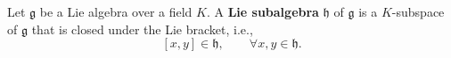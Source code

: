 Let $\mathfrak{g}$ be a Lie algebra over a field $K$. A \textbf{Lie subalgebra} $\mathfrak{h}$ of $\mathfrak{g}$ is a $K$-subspace of $\mathfrak{g}$ that is closed under the Lie bracket, i.e.,
$$
[x, y] \in \mathfrak{h}, \qquad \forall x, y \in \mathfrak{h}.
$$

